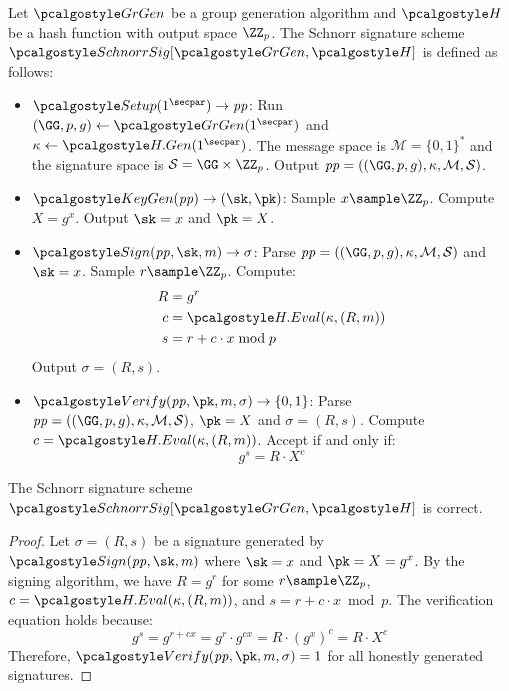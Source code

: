 \begin{definition}\label{def:schnorr}
  Let $\grgen$ be a group generation algorithm and $\algo{H}$ be a hash function with output space $\ZZ_p$. The Schnorr signature scheme $\algo{SchnorrSig}[\grgen, \algo{H}]$ is defined as follows:
  \begin{itemize}
    \item $\algo{Setup}(1^\secpar) \rightarrow \params$: Run $\gparam \gets \grgen(1^\secpar)$ and $\kappa \gets \algo{H.Gen}(1^\secpar)$. The message space is $\mathcal{M} = \{0,1\}^*$ and the signature space is $\mathcal{S} = \GG \times \ZZ_p$. Output $\params = (\gparam, \kappa, \mathcal{M}, \mathcal{S})$.
    
    \item $\algo{KeyGen}(\params) \rightarrow (\sk, \pk)$: Sample $x \sample \ZZ_p$. Compute $X = g^x$. Output $\sk = x$ and $\pk = X$.
    
    \item $\algo{Sign}(\params, \sk, m) \rightarrow \sigma$: Parse $\params = (\gparam, \kappa, \mathcal{M}, \mathcal{S})$ and $\sk = x$. Sample $r \sample \ZZ_p$. Compute:
    \begin{align*}
      R &= g^r \\
      c &= \algo{H.Eval}(\kappa, (R, m)) \\
      s &= r + c \cdot x \bmod p
    \end{align*}
    Output $\sigma = (R, s)$.
    
    \item $\algo{Verify}(\params, \pk, m, \sigma) \rightarrow \{0, 1\}$: Parse $\params = (\gparam, \kappa, \mathcal{M}, \mathcal{S})$, $\pk = X$ and $\sigma = (R, s)$. Compute $c = \algo{H.Eval}(\kappa, (R, m))$. Accept if and only if:
    \[
      g^s = R \cdot X^c
    \]
  \end{itemize}
\end{definition}

\begin{lemma}\label{lem:schnorr-correctness}
  The Schnorr signature scheme\\ $\algo{SchnorrSig}[\grgen, \algo{H}]$ is correct.
\end{lemma}

\begin{proof}
  Let $\sigma = (R, s)$ be a signature generated by $\algo{Sign}(\params, \sk, m)$ where $\sk = x$ and $\pk = X = g^x$. By the signing algorithm, we have $R = g^r$ for some $r \sample \ZZ_p$, $c = \algo{H.Eval}(\kappa, (R, m))$, and $s = r + c \cdot x \bmod p$. The verification equation holds because:
  \[
    g^s = g^{r + cx} = g^r \cdot g^{cx} = R \cdot (g^x)^c = R \cdot X^c
  \]
  Therefore, $\algo{Verify}(\params, \pk, m, \sigma) = 1$ for all honestly generated signatures.
\end{proof}

